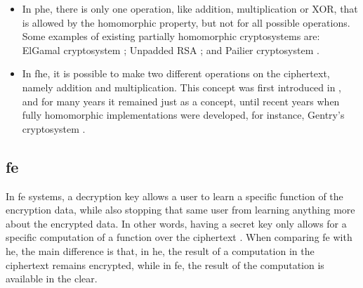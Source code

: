 \begin{itemize}
    \setlength\itemsep{1em}
    \item In \ac{phe}, there is only one operation, like addition, multiplication or XOR, that is allowed by the homomorphic property, but not for all possible operations. Some examples of existing partially homomorphic cryptosystems are:
    ElGamal cryptosystem \cite{elgamal1985public}; Unpadded RSA \cite{rivest1978method}; and Pailier cryptosystem \cite{paillier1999public}.

    \item In \ac{fhe}, it is possible to make two different operations on the ciphertext, namely addition and multiplication. This concept was first introduced in \cite{rivest1978data}, and for many years it remained just as a concept, until recent years when fully homomorphic implementations were developed, for instance, Gentry's cryptosystem \cite{gentry2009fully}.
\end{itemize}


\subsection{\acl{fe}}
\label{ssec:FunctionalEncryption}


In \acf{fe} systems, a decryption key allows a user to learn a specific function of the encryption data, while also stopping that same user from learning anything more about the encrypted data. In other words, having a secret key only allows for a specific computation of a function over the ciphertext \cite{boneh2011functional}. When comparing \ac{fe} with \ac{he}, the main difference is that, in \ac{he}, the result of a computation in the ciphertext remains encrypted, while in \ac{fe}, the result of the computation is available in the clear. 




